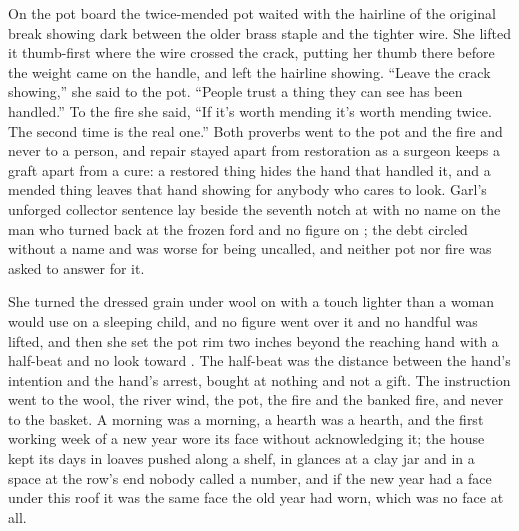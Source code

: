 On the pot board the twice-mended pot waited with the hairline of the original break showing dark between the older brass staple and the tighter wire. She lifted it thumb-first where the wire crossed the crack, putting her thumb there before the weight came on the handle, and left the hairline showing. “Leave the crack showing,” she said to the pot. “People trust a thing they can see has been handled.” To the fire she said, “If it's worth mending it's worth mending twice. The second time is the real one.” Both proverbs went to the pot and the fire and never to a person, and repair stayed apart from restoration as a surgeon keeps a graft apart from a cure: a restored thing hides the hand that handled it, and a mended thing leaves that hand showing for anybody who cares to look. Garl's unforged collector sentence lay beside the seventh notch at  with no name on the man who turned back at the frozen ford and no figure on ; the debt circled without a name and was worse for being uncalled, and neither pot nor fire was asked to answer for it.

She turned the dressed grain under wool on  with a touch lighter than a woman would use on a sleeping child, and no figure went over it and no handful was lifted, and then she set the pot rim two inches beyond the reaching hand with a half-beat and no look toward . The half-beat was the distance between the hand's intention and the hand's arrest, bought at nothing and not a gift. The instruction went to the wool, the river wind, the pot, the fire and the banked fire, and never to the basket. A morning was a morning, a hearth was a hearth, and the first working week of a new year wore its face without acknowledging it; the house kept its days in loaves pushed along a shelf, in glances at a clay jar and in a space at the row's end nobody called a number, and if the new year had a face under this roof it was the same face the old year had worn, which was no face at all.

\scenebreak

